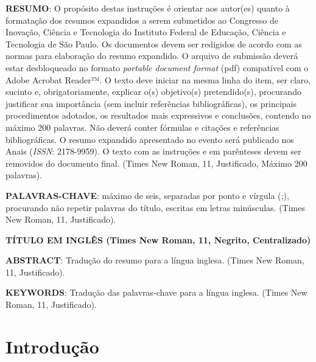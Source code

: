 \documentclass[a4paper,11pt]{article} %
\begin{document}






\vspace{0.5cm}
\noindent\textbf{RESUMO}: O propósito destas instruções é orientar aos autor(es) quanto à formatação dos resumos expandidos a serem submetidos ao Congresso de Inovação, Ciência e Tecnologia do Instituto Federal de Educação, Ciência e Tecnologia de São Paulo. Os documentos devem ser redigidos de acordo com as normas para elaboração do resumo expandido. O arquivo de submissão deverá estar desbloqueado no formato \textit{portable document format} (pdf) compatível com o Adobe Acrobat Reader™. O texto deve iniciar na mesma linha do item, ser claro, sucinto e, obrigatoriamente, explicar o(s) objetivo(s) pretendido(s), procurando justificar sua importância (sem incluir referências bibliográficas), os principais procedimentos adotados, os resultados mais expressivos e conclusões, contendo no máximo 200 palavras. Não deverá conter fórmulas e citações e referências bibliográficas. O resumo expandido apresentado no evento será publicado nos Anais (\textit{ISSN}: 2178-9959). O texto com as instruções e em parênteses devem ser removidos do documento final. (Times New Roman, 11, Justificado, Máximo 200 palavras).

\vspace{0.5cm}
\noindent\textbf{PALAVRAS-CHAVE}: máximo de seis, separadas por ponto e vírgula (;), procurando não repetir palavras do título, escritas em letras minúsculas. (Times New Roman, 11, Justificado).

\vspace{0.5cm}
 \begin{center}
 \textbf{TÍTULO EM INGLÊS (Times New Roman, 11, Negrito, Centralizado)}
 \end{center}

\noindent\textbf{ABSTRACT}: Tradução do resumo para a língua inglesa. (Times New Roman, 11, Justificado).

\vspace{0.5cm}
\noindent\textbf{KEYWORDS}: Tradução das palavras-chave para a língua inglesa. (Times New Roman, 11, Justificado).

\section*{Introdução}
\end{document}
